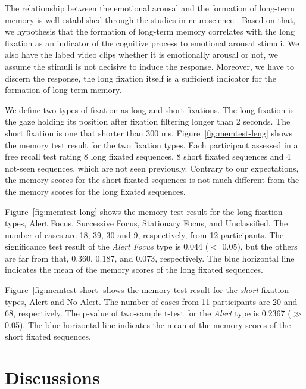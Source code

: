 \documentclass[10pt,letterpaper]{article}
\begin{document}
The relationship between the emotional arousal and the formation of long-term memory is well established through the studies in neuroscience \cite{Cahill1996amyg,Cahill1998baso}. Based on that, we hypothesis that the formation of long-term memory correlates with the long fixation as an indicator of the cognitive process to emotional arousal stimuli. We also have the labed video clips whether it is emotionally arousal or not, we assume the stimuli is not decisive to induce the response. Moreover, we have to discern the response, the long fixation itself is a sufficient indicator for the formation of long-term memory.

We define two types of fixation as long and short fixations. The long fixation is the gaze holding its position after fixation filtering longer than 2 seconds. The short fixation is one that shorter than 300 ms. Figure~\ref{fig:memtest-leng} shows the memory test result for the two fixation types. Each participant assessed in a free recall test rating 8 long fixated sequences, 8 short fixated sequences and 4 not-seen sequences, which are not seen previously. Contrary to our expectations, the memory scores for the short fixated sequences is not much different from the the memory scores for the long fixated sequences.

Figure~\ref{fig:memtest-long} shows the memory test result for the long fixation types, Alert Focus, Successive Focus, Stationary Focus, and Unclassified. The number of cases are 18, 39, 30 and 9, respectively, from 12 participants. The significance test result of the \textit{Alert Focus} type is 0.044 ($<$ 0.05), but the others are far from that, 0.360, 0.187, and 0.073, respectively. The blue horizontal line indicates the mean of the memory scores of the long fixated sequences.

Figure~\ref{fig:memtest-short} shows the memory test result for the \textit{short} fixation types, Alert and No Alert. The number of cases from 11 participants are 20 and 68, respectively. The p-value of two-sample t-test for the \textit{Alert} type is 0.2367 ($\gg$ 0.05). The blue horizontal line indicates the mean of the memory scores of the short fixated sequences.


\section{Discussions}
\end{document}
